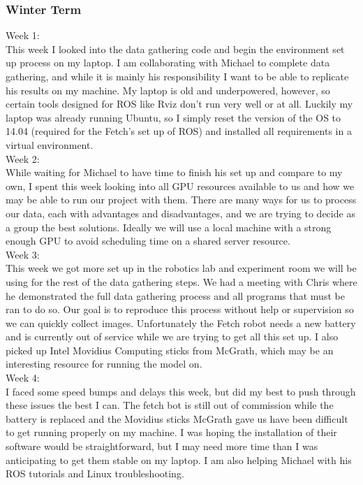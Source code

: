 \documentclass[draftclsnofoot, onecolumn, 10pt, compsoc]{IEEEtran}
\begin{document}
    \subsubsection{Winter Term}
    	Week 1: \\ \indent This week I looked into the data gathering code and begin the environment set up process on my laptop. I am collaborating with Michael to complete data gathering, and while it is mainly his responsibility I want to be able to replicate his results on my machine. My laptop is old and underpowered, however, so certain tools designed for ROS like Rviz don't run very well or at all. Luckily my laptop was already running Ubuntu, so I simply reset the version of the OS to 14.04 (required for the Fetch's set up of ROS) and installed all requirements in a virtual environment. \\
    	Week 2: \\ \indent While waiting for Michael to have time to finish his set up and compare to my own, I spent this week looking into all GPU resources available to us and how we may be able to run our project with them. There are many ways for us to process our data, each with advantages and disadvantages, and we are trying to decide as a group the best solutions. Ideally we will use a local machine with a strong enough GPU to avoid scheduling time on a shared server resource. \\
    	Week 3: \\ \indent This week we got more set up in the robotics lab and experiment room we will be using for the rest of the data gathering steps.  We had a meeting with Chris where he demonstrated the full data gathering process and all programs that must be ran to do so. Our goal is to reproduce this process without help or supervision so we can quickly collect images. Unfortunately the Fetch robot needs a new battery and is currently out of service while we are trying to get all this set up. I also picked up Intel Movidius Computing sticks from McGrath, which may be an interesting resource for running the model on. \\
    	Week 4: \\ \indent I faced some speed bumps and delays this week, but did my best to push through these issues the best I can. The fetch bot is still out of commission while the battery is replaced and the Movidius sticks McGrath gave us have been difficult to get running properly on my machine. I was hoping the installation of their software would be straightforward, but I may need more time than I was anticipating to get them stable on my laptop. I am also helping Michael with his ROS tutorials and Linux troubleshooting. \\
\end{document}
